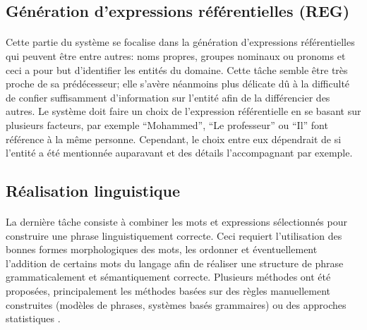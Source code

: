 	\subsection{Génération d’expressions référentielles (REG)}
	\paragraph{}Cette partie du système se focalise dans la génération d’expressions référentielles qui peuvent être entre autres: noms propres, groupes nominaux ou pronoms et ceci a pour but d’identifier les entités du domaine. Cette tâche semble être très proche de sa prédécesseur; elle s’avère néanmoins plus délicate dû à la difficulté de confier suffisamment d’information sur l’entité afin de la différencier des autres\cite{Reiter:1997}. Le système doit faire un choix de l’expression référentielle en se basant sur plusieurs facteurs, par exemple “Mohammed”, “Le professeur” ou “Il” font référence à la même personne. Cependant, le choix entre eux dépendrait de si l’entité a été mentionnée auparavant et des détails l’accompagnant par exemple. 
	
	\subsection{Réalisation linguistique}
	\paragraph{}
	La dernière tâche consiste à combiner les mots et expressions sélectionnés pour construire une phrase linguistiquement correcte. Ceci requiert l’utilisation des bonnes formes morphologiques des mots, les ordonner et éventuellement  l’addition de certains mots du langage afin de réaliser une structure de phrase grammaticalement et sémantiquement correcte. Plusieurs méthodes ont été proposées, principalement les méthodes basées sur des règles manuellement construites (modèles de phrases, systèmes basés grammaires) ou des approches statistiques \cite{Gatt2018}.
